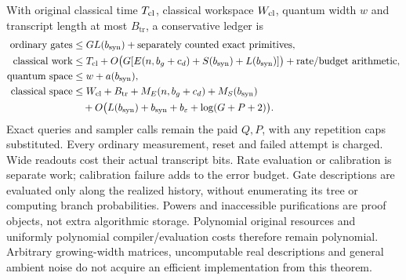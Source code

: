 \documentclass[11pt]{article}
\theoremstyle{remark}
\newcommand{\eps}{\varepsilon}
\begin{document}
With original classical time $T_{\rm cl}$, classical workspace $W_{\rm cl}$,
quantum width $w$ and transcript length at most $B_{\mathrm{tr}}$, a conservative ledger is
\begin{align*}
 \text{ordinary gates}&\le G L(b_{\mathrm{syn}})
       +\text{separately counted exact primitives},\\
 \text{classical work}&\le T_{\rm cl}
       +O\bigl(G[E(n,b_g+c_d)+S(b_{\mathrm{syn}})+L(b_{\mathrm{syn}})]\bigr)
       +\text{rate/budget arithmetic},\\
 \text{quantum space}&\le w+a(b_{\mathrm{syn}}),\\
 \text{classical space}&\le W_{\rm cl}+B_{\mathrm{tr}}+M_E(n,b_g+c_d)+M_S(b_{\mathrm{syn}})\\
 &\hspace{1em}+O\bigl(L(b_{\mathrm{syn}})+b_{\mathrm{syn}}+b_\eps+\log(G+P+2)\bigr).
\end{align*}
Exact queries and sampler calls remain the paid $Q,P$, with any repetition
caps substituted. Every ordinary measurement, reset and failed attempt is
charged. Wide readouts cost their actual transcript bits. Rate evaluation
or calibration is separate work; calibration failure adds to the error
budget. Gate descriptions are evaluated only along the realized history,
without enumerating its tree or computing branch probabilities. Powers and
inaccessible purifications are proof objects, not extra algorithmic storage.
Polynomial original resources and uniformly polynomial compiler/evaluation
costs therefore remain polynomial. Arbitrary growing-width matrices,
uncomputable real descriptions and general ambient noise do not acquire
an efficient implementation from this theorem.
\end{document}
